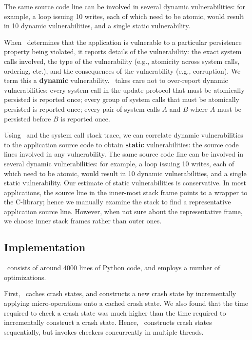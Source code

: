 The same
source code line can be involved in several dynamic vulnerabilities: for
example, a loop issuing 10 writes, each of which need to be atomic, would
result in 10 dynamic vulnerabilities, and a single static vulnerability. 

When \toolname\ determines that the application is vulnerable to a particular
persistence property being violated, it reports details of the vulnerability:
the exact system calls involved, the type of the vulnerability (e.g., atomicity
across system calls, ordering, etc.), and the consequences of the vulnerability
(e.g., corruption). We term this a \textbf{dynamic} vulnerability.
\toolname\
takes care not to over-report dynamic vulnerabilities: every system call in the
update protocol that must be atomically persisted is reported once; every group
of system calls that must be atomically persisted is reported once; every pair
of system calls $A$ and $B$ where $A$ must be persisted before $B$ is reported
once.  

Using \toolname\ and the system call stack trace, we can correlate dynamic
vulnerabilities to the application source code to obtain \textbf{static}
vulnerabilities: the source code lines involved in any vulnerability. The same
source code line can be involved in several dynamic vulnerabilities: for
example, a loop issuing 10 writes, each of which need to be atomic, would
result in 10 dynamic vulnerabilities, and a single static vulnerability.  Our
estimate of static vulnerabilities is conservative.  In most applications, the
source line in the inner-most stack frame points to a wrapper to the C-library;
hence we manually examine the stack to find a representative application source
line. However, when not sure about the representative frame, we choose inner
stack frames rather than outer ones. 
\fi

\subsection{Implementation}
\label{sec-implementation}

\toolname\ consists of around 4000 lines of Python code, and employs
a number of optimizations.

First, \toolname\ caches crash states, and constructs a new crash state by incrementally
applying micro-operations onto a cached crash state. We also found that the
time required to check a crash state was much higher than the time required to
incrementally construct a crash state. %
Hence, \toolname\ constructs crash states sequentially, but invokes checkers concurrently in multiple threads.

